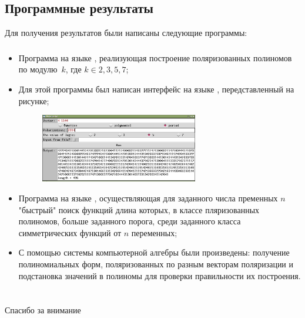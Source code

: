 \documentclass[t]{beamer}
\begin{document}
\subsection{Программные результаты}
\begin{frame}
Для получения результатов были написаны следующие программы:
\frametitle{\insertsection}
\framesubtitle{\insertsubsection}
 {
\begin{itemize}
\item Программа на языке {}, реализующая построение поляризованных полиномов по
    модулю~$k$, где $k \in {2,3,5,7}$;
\item Для этой программы был написан интерфейс на языке {}, передставленный на
    рисунке;
    \begin{figure}[h]
    \centering
    \includegraphics[width=0.65\textwidth]{polyscreen.png}
    \end{figure}
\end{itemize}
}
 {
\begin{itemize}
\item Программа на языке {}, осуществляющая для заданного числа пременных $n$
    "быстрый"{} поиск функций длина которых, в классе пляризованных полиномов, больше заданного
    порога, среди заданного класса симметрических функций от $n$ переменных;
\item С помощью системы компьютерной алгебры {} были произведены: получение
    полиномиальных форм, поляризованных по разным векторам поляризации и подстановка значений в
    полиномы для проверки правильности их построения.
\end{itemize}
}
\end{frame}

\section*{}
\begin{frame}[plain,c]
\begin{center}
\Huge Спасибо за внимание
\end{center}
\end{frame}
\end{document}
